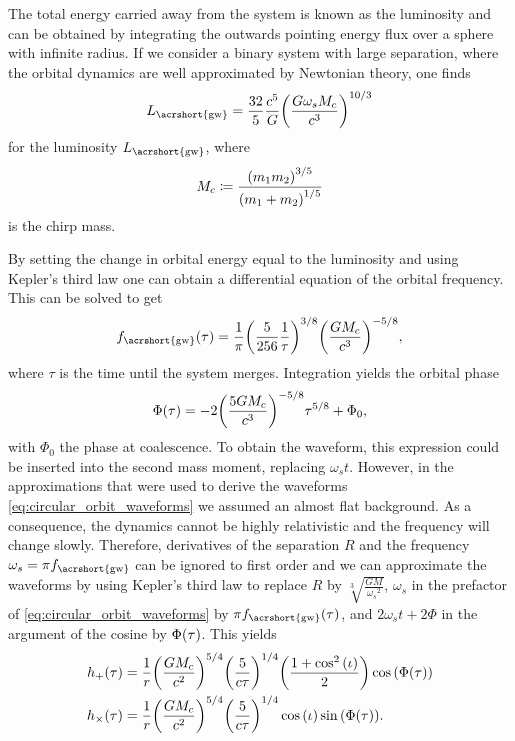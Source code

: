 The total energy carried away from the system is known as the luminosity and can be obtained by integrating the outwards pointing energy flux over a sphere with infinite radius. If we consider a binary system with large separation, where the orbital dynamics are well approximated by Newtonian theory, one finds
\begin{equation}\label{eq:luminosity_linear}
L_{\text{\acrshort{gw}}}=\frac{32}{5}\frac{c^5}{G}\lr{\frac{G\omega_s M_c}{c^3}}^{10 / 3}
\end{equation}
for the luminosity $L_{\text{\acrshort{gw}}}$, where
\begin{equation}
M_c\coloneqq \frac{{\left( m_1 m_2 \right)}^{3/5}}{{\left( m_1 + m_2 \right)}^{1/5}}
\end{equation}
is the chirp mass.

By setting the change in orbital energy equal to the luminosity and using Kepler's third law one can obtain a differential equation of the orbital frequency. This can be solved to get~\cite{Maggiore:2008aaa}%
\begin{equation}
f_{\text{\acrshort{gw}}}\lr{\tau}=\frac{1}{\pi}\lr{\frac{5}{256}\frac{1}{\tau}}^{3/8}\lr{\frac{G M_c}{c^3}}^{-5/8},
\end{equation}
where $\tau$ is the time until the system merges. Integration yields the orbital phase
\begin{equation}
\Phi{\left( \tau \right)} = -2{\left( \frac{5 G M_c}{c^3} \right)}^{-5/8}\tau^{5/8}+\Phi_0,
\end{equation}
with $\Phi_0$ the phase at coalescence. To obtain the waveform, this expression could be inserted into the second mass moment, replacing $\omega_s t$. However, in the approximations that were used to derive the waveforms \eqref{eq:circular_orbit_waveforms} we assumed an almost flat background. As a consequence, the dynamics cannot be highly relativistic and the frequency will change slowly. Therefore, derivatives of the separation $R$ and the frequency $\omega_s = \pi f_{\text{\acrshort{gw}}}$ can be ignored to first order and we can approximate the waveforms by using Kepler's third law to replace $R$ by $\sqrt[3]{\frac{G M}{{\omega_s}^2}}$, $\omega_s$ in the prefactor of \eqref{eq:circular_orbit_waveforms} by $\pi f_{\text{\acrshort{gw}}}\lr{\tau}$, and $2\omega_s t + 2 \Phi$ in the argument of the cosine by $\Phi{\left( \tau \right)}$. This yields
\begin{align}\label{eq:linear_waveform}
h_+{\left( \tau \right)} & = \frac{1}{r}{\left( \frac{G M_c}{c^2} \right)}^{5/4}{\left( \frac{5}{c\tau} \right)}^{1/4}{\left( \frac{1+\cos^2{\left( \iota \right)}}{2} \right)}\cos{\left( \Phi{\left( \tau \right)} \right)}\nonumber\\
h_\times{\left( \tau \right)} & = \frac{1}{r}{\left( \frac{G M_c}{c^2} \right)}^{5/4}{\left( \frac{5}{c\tau} \right)}^{1/4}\cos{\left( \iota \right)}\sin{\left( \Phi{\left( \tau \right)} \right)}.
\end{align}


